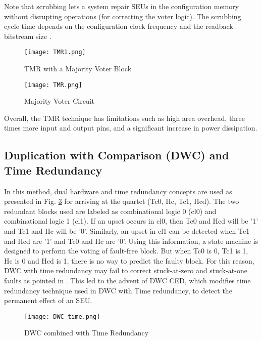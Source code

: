 \documentclass[10pt,journal,cspaper,compsoc]{IEEEtran}
\begin{document}
Note that scrubbing lets a system repair SEUs in the configuration
memory without disrupting operations (for correcting the voter logic). The
scrubbing cycle time depends on the configuration
clock frequency and the readback bitstream size \cite{KLCR}.

\begin{figure}[t]
  \caption{TMR with a Majority Voter Block}\label{fig2}
\texttt{[image: TMR1.png]}
\end{figure}
\begin{figure}[t]
  \caption{Majority Voter Circuit}\label{fig3}
\texttt{[image: TMR.png]}
\end{figure}
Overall, the TMR technique has
limitations such as high area overhead, three times
more input and output pins, and a significant increase
in power dissipation.
\subsection{Duplication with Comparison (DWC) and Time Redundancy}
In this method, dual hardware and time redundancy concepts are used as presented in Fig. \ref{fig4} for arriving at the quartet (Tc0, Hc, Tc1, Hcd). The two redundant blocks used are labeled as combinational logic 0 (cl0) and combinational logic 1 (cl1). If an upset occurs in cl0, then Tc0 and Hcd will be '1' and Tc1 and Hc will be '0'. Similarly, an upset in cl1 can be detected when Tc1 and Hcd are '1' and Tc0 and Hc are '0'. Using this information, a state machine is designed to perform the voting of fault-free block. But when Tc0 is 0, Tc1 is 1, Hc is 0 and Hcd is 1, there is no way to predict the faulty block. For this reason, DWC with time redundancy may fail to correct stuck-at-zero and stuck-at-one faults as pointed in \cite{KLCR}. This led to the advent of DWC CED, which modifies time redundancy technique used in DWC with Time redundancy, to detect the permanent effect of an SEU.
\begin{figure}[t]
  \caption{DWC combined with Time Redundancy \cite{KLCR}}\label{fig4}
\texttt{[image: DWC\_time.png]}
\end{figure}
\end{document}
